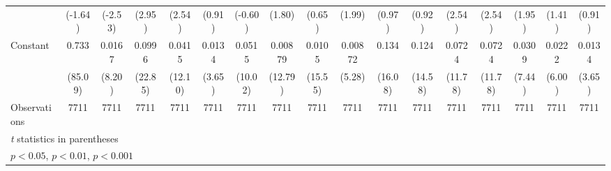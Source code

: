 \begin{table}[htbp]
\begin{tabular}{l*{16}{c}}
                    &     (-1.64)         &     (-2.53)         &      (2.95)         &      (2.54)         &      (0.91)         &     (-0.60)         &      (1.80)         &      (0.65)         &      (1.99)         &      (0.97)         &      (0.92)         &      (2.54)         &      (2.54)         &      (1.95)         &      (1.41)         &      (0.91)         \\
\addlinespace
Constant            &       0.733\sym{***}&      0.0167\sym{***}&      0.0996\sym{***}&      0.0415\sym{***}&      0.0134\sym{***}&      0.0515\sym{***}&     0.00879\sym{***}&      0.0105\sym{***}&     0.00872\sym{***}&       0.134\sym{***}&       0.124\sym{***}&      0.0724\sym{***}&      0.0724\sym{***}&      0.0309\sym{***}&      0.0222\sym{***}&      0.0134\sym{***}\\
                    &     (85.09)         &      (8.20)         &     (22.85)         &     (12.10)         &      (3.65)         &     (10.02)         &     (12.79)         &     (15.55)         &      (5.28)         &     (16.08)         &     (14.58)         &     (11.78)         &     (11.78)         &      (7.44)         &      (6.00)         &      (3.65)         \\
\midrule
Observations        &        7711         &        7711         &        7711         &        7711         &        7711         &        7711         &        7711         &        7711         &        7711         &        7711         &        7711         &        7711         &        7711         &        7711         &        7711         &        7711         \\
\bottomrule
\multicolumn{17}{l}{\footnotesize \textit{t} statistics in parentheses}\\
\multicolumn{17}{l}{\footnotesize \sym{*} \(p<0.05\), \sym{**} \(p<0.01\), \sym{***} \(p<0.001\)}\\
\end{tabular}
\end{table}
